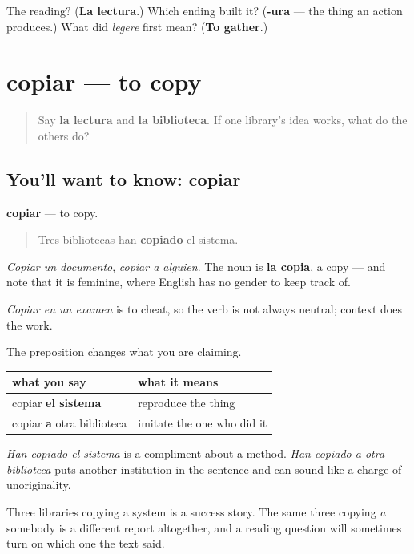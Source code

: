 \begin{tcolorbox}[breakable,colback=teal!4,colframe=teal!35!black,title={Before you move on}]
The reading? (\textbf{La lectura}.) Which ending built it? (\textbf{-ura} — the thing an action produces.) What did \emph{legere} first mean? (\textbf{To gather}.)
\end{tcolorbox}
\section[copiar]{copiar — to copy}

\label{lesson:ES-C472-copiar}



\begin{quote}
Say \textbf{la lectura} and \textbf{la biblioteca}. If one library's idea works, what do the others do?
\end{quote}

\subsection*{You'll want to know: copiar}
\textbf{copiar} — to copy.

\begin{quote}
Tres bibliotecas han \textbf{copiado} el sistema.
\end{quote}

\emph{Copiar un documento}, \emph{copiar a alguien}. The noun is \textbf{la copia}, a copy — and note that it is feminine, where English has no gender to keep track of.

\emph{Copiar en un examen} is to cheat, so the verb is not always neutral; context does the work.

\begin{grammarlens}[title={Grammar Lens: copying a thing and copying a person}]
The preposition changes what you are claiming.

\noindent
\begin{tabularx}{\linewidth}{@{}>{\raggedright\arraybackslash}X>{\raggedright\arraybackslash}X@{}}
\toprule
\textbf{what you say} & \textbf{what it means} \\
\midrule
copiar \textbf{el sistema} & reproduce the thing \\
copiar \textbf{a} otra biblioteca & imitate the one who did it \\
\bottomrule
\end{tabularx}

\emph{Han copiado el sistema} is a compliment about a method. \emph{Han copiado a otra biblioteca} puts another institution in the sentence and can sound like a charge of unoriginality.

Three libraries copying a system is a success story. The same three copying \emph{a} somebody is a different report altogether, and a reading question will sometimes turn on which one the text said.
\end{grammarlens}

